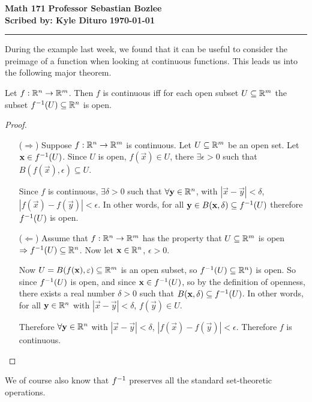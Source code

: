 \documentclass[12pt, twosided]{article}
\begin{document}
\noindent \textbf{Math 171} \hfill \textbf{Professor Sebastian Bozlee} \\
\textbf{Scribed by: Kyle Dituro} \hfill \textbf{\today}\hrule
\vspace{.2in}

During the example last week, we found that it can be useful to consider the preimage of a function when looking at continuous functions. This leads us into the following major theorem.

\begin{thm}
  Let \(f: \mathbb{R}^n \to \mathbb{R}^m\). Then \(f\) is continuous iff for each open subset \(U \subseteq \mathbb{R}^m\) the subset \(f^{-1}(U)\subseteq \mathbb{R}^n\) is open.
\end{thm}
\begin{proof}
  \begin{enumerate}
  \item [(\(\Rightarrow\))] Suppose \(f: \mathbb{R}^n \to \mathbb{R}^m\) is continuous. Let \(U \subseteq \mathbb{R}^m\) be an open set. Let \(\mathbf{x} \in f^{-1}(U)\). Since \(U\) is open, \(f(\vec{x}) \in U\), there \(\exists \epsilon > 0\) such that \(B(f(\vec{x}), \epsilon) \subseteq U\).

    Since \(f\) is continuous, \(\exists \delta > 0\) such that \(\forall \mathbf{y} \in \mathbb{R}^n\), with \(|\vec{x} - \vec{y}| < \delta\), \(|f(\vec{x}) - f(\vec{y})| < \epsilon\). In other words, for all \(\mathbf{y} \in B(\mathbf{x}, \delta) \subseteq f^{-1}(U)\) therefore \(f^{-1}(U)\) is open.
  \item [(\(\Leftarrow\))] Assume that \(f: \mathbb{R}^n \to \mathbb{R}^m\) has the property that \(U \subseteq \mathbb{R}^m\) is open \(\Rightarrow f^{-1}(U) \subseteq \mathbb{R}^n\). Now let \(\mathbf{x} \in \mathbb{R}^n\), \(\epsilon > 0\).

    Now \(U = B(f(\mathbf{x}), \varepsilon) \subseteq \mathbb{R}^m\) is an open subset, so \(f^{-1}(U) \subseteq \mathbb{R}^n)\) is open. So since \(f^{-1}(U)\) is open, and since \(\mathbf{x} \in f^{-1}(U)\), so by the definition of openness, there exists a real number \(\delta > 0\) such that \(B(\mathbf{x}, \delta) \subseteq f^{-1}(U)\). In other words, for all \(\mathbf{y} \in \mathbb{R}^n\) with \(|\vec{x} - \vec{y}| < \delta\), \(f(\vec{y}) \in U\).

    Therefore \(\forall \mathbf{y} \in \mathbb{R}^n\) with \(|\vec{x} - \vec{y}| < \delta\), \(|f(\vec{x}) - f(\vec{y})| < \epsilon\). Therefore \(f\) is continuous.
  \end{enumerate}
\end{proof}

We of course also know that \(f^{-1}\) preserves all the standard set-theoretic operations.
\end{document}
